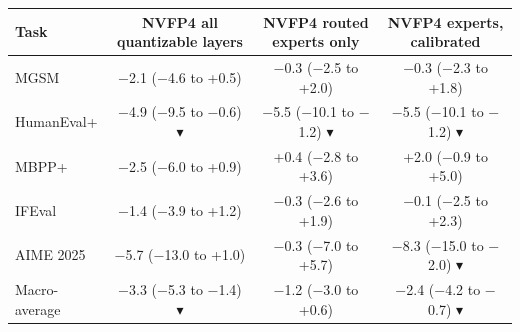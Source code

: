 \begin{tabular}{@{}lccc@{}}
\toprule
Task & NVFP4 all quantizable layers & NVFP4 routed experts only & NVFP4 experts, calibrated \\
\midrule
MGSM & $-$2.1 ($-$4.6 to +0.5) & $-$0.3 ($-$2.5 to +2.0) & $-$0.3 ($-$2.3 to +1.8) \\
HumanEval+ & \cellcolor[HTML]{F6D3C9}$-$4.9 ($-$9.5 to $-$0.6) \textcolor[HTML]{B4452A}{$\blacktriangledown$} & \cellcolor[HTML]{F6D3C9}$-$5.5 ($-$10.1 to $-$1.2) \textcolor[HTML]{B4452A}{$\blacktriangledown$} & \cellcolor[HTML]{F6D3C9}$-$5.5 ($-$10.1 to $-$1.2) \textcolor[HTML]{B4452A}{$\blacktriangledown$} \\
MBPP+ & $-$2.5 ($-$6.0 to +0.9) & +0.4 ($-$2.8 to +3.6) & +2.0 ($-$0.9 to +5.0) \\
IFEval & $-$1.4 ($-$3.9 to +1.2) & $-$0.3 ($-$2.6 to +1.9) & $-$0.1 ($-$2.5 to +2.3) \\
AIME 2025 & $-$5.7 ($-$13.0 to +1.0) & $-$0.3 ($-$7.0 to +5.7) & \cellcolor[HTML]{F6D3C9}$-$8.3 ($-$15.0 to $-$2.0) \textcolor[HTML]{B4452A}{$\blacktriangledown$} \\
\midrule
Macro-average & \cellcolor[HTML]{F6D3C9}$-$3.3 ($-$5.3 to $-$1.4) \textcolor[HTML]{B4452A}{$\blacktriangledown$} & $-$1.2 ($-$3.0 to +0.6) & \cellcolor[HTML]{F6D3C9}$-$2.4 ($-$4.2 to $-$0.7) \textcolor[HTML]{B4452A}{$\blacktriangledown$} \\
\bottomrule
\end{tabular}
